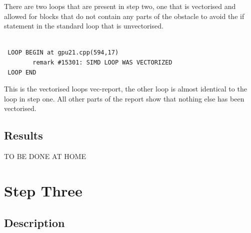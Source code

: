 \documentclass[paper=a4, fontsize=11pt]{scrartcl}
\numberwithin{equation}{section}		%
\numberwithin{figure}{section}			%
\numberwithin{table}{section}				%
\begin{document}
There are two loops that are present in step two, one that is vectorised and allowed for blocks that do not contain any parts of the obstacle to avoid the if statement in the standard loop that is unvectorised. 

\begin{lstlisting}

 LOOP BEGIN at gpu21.cpp(594,17)
		remark #15301: SIMD LOOP WAS VECTORIZED
 LOOP END

\end{lstlisting}

This is the vectorised loops vec-report, the other loop is almost identical to the loop in step one. All other parts of the report show that nothing else has been vectorised.

\subsection{Results}

TO BE DONE AT HOME


\section{Step Three}
\subsection{Description}
\end{document}
